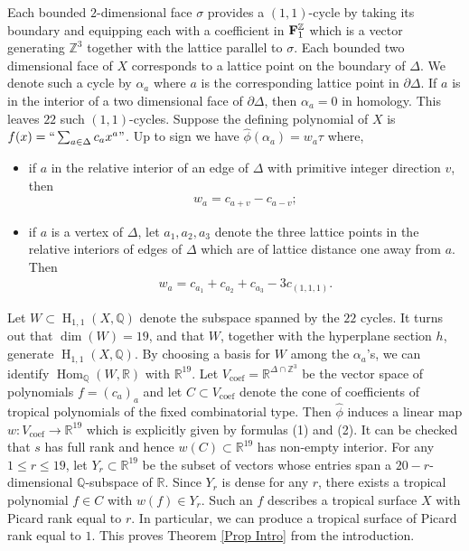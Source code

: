 \documentclass[11pt]{article}
\numberwithin{equation}{numsection}
\newcommand{\ZZ}{{\mathbb Z}}
\newcommand{\Z}{{\mathbb Z}}
\newcommand{\R}{{\mathbb R}}
\newcommand{\QQ}{{\mathbb Q}}
\newcommand{\phihat}{\hat{\phi}}
\newcommand{\BF}{{\bf F}}
\DeclareMathOperator{\Hom}{Hom}
\DeclareMathOperator{\HH}{H}
\begin{document}
\begin{example}
{Each  bounded $2$-dimensional face $\sigma$ 
provides a $(1,1)$-cycle by taking its boundary and equipping each with a coefficient in  $\BF_1^{\ZZ}$
which is a vector generating $\Z^3$ together with the lattice parallel to  $\sigma$.
 Each bounded two dimensional face of $X$ corresponds to a lattice point on the boundary of $\Delta$. 
We denote such a cycle by $\alpha_a$ where $a$ is the corresponding lattice point in $\partial \Delta$. 
If $a$ is in the interior of a two dimensional face of $\partial \Delta$, 
then $\alpha_{a} = 0$ in homology. This leaves $22$ such $(1,1)$-cycles.
Suppose the defining polynomial of $X$ is $f(x) = ``\sum_{a \in \Delta} c_a x^a"$.
Up  to sign we have
$\phihat(\alpha_a)  = w_{a} \tau $ where, 
\begin{itemize}
\item[\rm (1)] if  $a$ in the relative interior of an edge of $\Delta$ with primitive integer direction $v$, then 
\begin{align*}
w_a = c_{a +v} - c_{a-v}; 
\end{align*}
\item[\rm (2)] if $a$ is a vertex of $\Delta$, let $a_1, a_2, a_3$ denote the three lattice points 
in the relative interiors of edges of $\Delta$ which are of lattice distance one  away from $a$. Then 
\begin{align*}
w_{a} = c_{a_1} + c_{a_2} + c_{a_3} - 3c_{(1,1,1)}.
\end{align*}
\end{itemize}
Let $W \subset \HH_{1, 1}(X, \QQ)$ denote the subspace spanned by the $22$ cycles.
It turns out that $\dim(W) = 19$, and that $W$, together with the hyperplane section $h$, generate $\HH_{1, 1}(X, \QQ)$. 
By choosing a basis for $W$ among the $\alpha_a$'s, we can identify $\Hom_{\QQ}(W, \R)$ with $\R^{19}$. 
Let $V_\text{coef} = \R^{\Delta \cap \Z^3}$ be the vector space of
polynomials $f = (c_a)_a$ and let $C \subset V_\text{coef}$ denote the cone 
of coefficients of tropical polynomials of the fixed  combinatorial type.
Then $\phihat$ induces a linear map  $w \colon V_\text{coef} \to \R^{19}$ 
which is explicitly given by formulas (1) and (2). It can be checked that $s$ has full rank and hence $w(C) \subset \R^{19}$
has non-empty interior. 
For any $1 \leq r \leq 19$, let $Y_r \subset \R^{19}$ be the subset of vectors
whose entries span a $20-r$-dimensional $\QQ$-subspace of $\R$. 
Since $Y_r$ is dense for any $r$, there exists a tropical polynomial  $f \in C$ with 
$w(f) \in Y_r$. Such an $f$ describes a tropical surface $X$ with Picard rank equal to $r$. 
In particular, we can produce a tropical surface of Picard rank equal to $1$.
This proves Theorem \ref{Prop Intro} from the introduction. }
\end{example}
\end{document}
